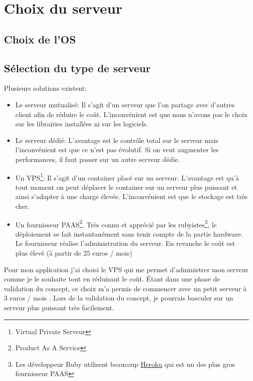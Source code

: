 \documentclass[]{report}
\begin{document}
  \section{Choix du serveur}

    \subsection{Choix de l'OS}

    \subsection{Sélection du type de serveur}

      Plusieurs solutions existent:

      \begin{itemize}
        \item Le serveur mutualisé: Il s’agit d’un serveur que l’on partage avec d’autres client afin de réduire le coût. L’inconvénient est que nous n’avons pas le choix sur les librairies installées ni sur les logiciels.
        \item Le serveur dédié: L’avantage est le contrôle total sur le serveur mais l’inconvénient est que ce n’est pas évolutif. Si on veut augmenter les performances, il faut passer sur un autre serveur dédie.
        \item Un VPS\footnote{Virtual Private Serveur}: Il s’agit d’un container placé sur un serveur. L’avantage est qu’à tout moment on peut déplacer le container sur un serveur plus puissant et ainsi s’adapter à une charge élevée. L’inconvénient est que le stockage est très cher.
        \item Un fournisseur PAAS\footnote{Product As A Service}. Très connu et apprécié par les rubyistes\footnote{Les développeur Ruby utilisent beaucoup  \href{https://www.heroku.com}{Heroku} qui est un des plus gros fournisseur PAAS}, le déploiement se fait instantanément sans tenir compte de la partie hardware.  Le fournisseur réalise l’administration du serveur. En revanche le coût est plus élevé (à partir de 25 euros / mois)
      \end{itemize}

      Pour mon application j’ai choisi le VPS qui me permet d’administrer mon serveur comme je le souhaite tout en réduisant le coût. Étant dans une phase de validation du concept, ce choix m’a permis de commencer avec un petit serveur à 3 euros / mois . Lors de la validation du concept, je pourrais basculer sur un serveur plus puissant très facilement.
\end{document}

